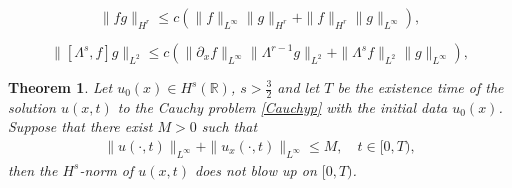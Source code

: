 \documentclass[10pt,a4paper]{amsart}
\newtheorem{theorem}{Theorem}
\begin{document}
\begin{equation}\label{KP1}
\|fg\|_{H^r}\leq c(\|f\|_{L^\infty}\|g\|_{H^r}+\|f\|_{H^r}\|g\|_{L^\infty}),
\end{equation}

\begin{equation}\label{KP2}
\|[\Lambda^s,f]g\|_{L^2}\leq c(\|\partial_xf\|_{L^\infty}\|\Lambda^{r-1}g\|_{L^2}
+\|\Lambda^sf\|_{L^2}\|g\|_{L^\infty}),
\end{equation}

\begin{theorem}\label{bls1}
Let $u_0(x)\in H^s(\mathbb{R})$, $s>\frac{3}{2}$ and let $T$ be the existence time of the solution $u(x,t)$ to  the Cauchy problem \eqref{Cauchyp} with the initial data $u_0(x)$. Suppose that there exist $M > 0$ such that
\begin{eqnarray}\label{blsc}
\|u(\cdot,t)\|_{L^\infty}+\|u_x(\cdot,t)\|_{L^\infty}\leq M, \quad t\in [0,T),
\end{eqnarray}
then the $H^s$-norm of $u(x,t)$ does not blow up on $[0,T)$.
\end{theorem}
\end{document}
